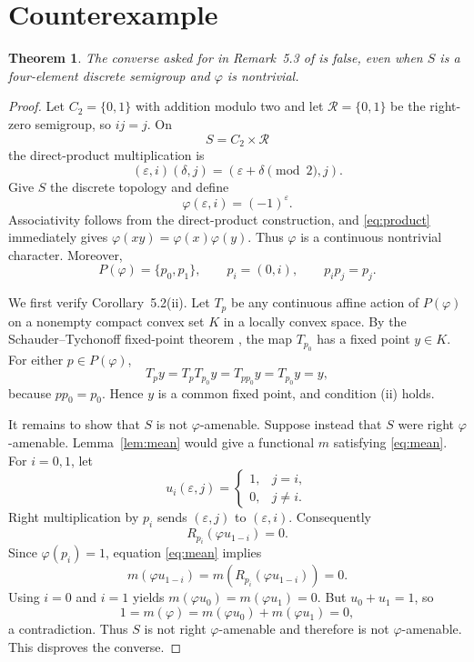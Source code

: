 \documentclass[11pt]{article}
\newtheorem{theorem}{Theorem}
\newcommand{\R}{\mathcal R}
\begin{document}
\section{Counterexample}

\begin{theorem}\label{thm:main}
The converse asked for in Remark~5.3 of \cite{JEG} is false, even when $S$ is
a four-element discrete semigroup and $\varphi$ is nontrivial.
\end{theorem}

\begin{proof}
Let $C_2=\{0,1\}$ with addition modulo two and let
$\R=\{0,1\}$ be the right-zero semigroup, so $ij=j$.  On
\[
 S=C_2\times\R
\]
the direct-product multiplication is
\begin{equation}\label{eq:product}
 (\varepsilon,i)(\delta,j)=(\varepsilon+\delta\!\!\pmod 2,j).
\end{equation}
Give $S$ the discrete topology and define
\[
 \varphi(\varepsilon,i)=(-1)^\varepsilon.
\]
Associativity follows from the direct-product construction, and
\eqref{eq:product} immediately gives
$\varphi(xy)=\varphi(x)\varphi(y)$.  Thus $\varphi$ is a continuous nontrivial
character.  Moreover,
\[
 P(\varphi)=\{p_0,p_1\},
 \qquad p_i=(0,i),
 \qquad p_ip_j=p_j.
\]

We first verify Corollary~5.2(ii).  Let $T_p$ be any continuous affine action
of $P(\varphi)$ on a nonempty compact convex set $K$ in a locally convex
space.  By the Schauder--Tychonoff fixed-point theorem \cite{Tychonoff}, the
map $T_{p_0}$ has a fixed point $y\in K$.  For either $p\in P(\varphi)$,
\[
 T_py=T_pT_{p_0}y=T_{pp_0}y=T_{p_0}y=y,
\]
because $pp_0=p_0$.  Hence $y$ is a common fixed point, and condition (ii)
holds.

It remains to show that $S$ is not $\varphi$-amenable.  Suppose instead that
$S$ were right $\varphi$-amenable.  Lemma~\ref{lem:mean} would give a
functional $m$ satisfying \eqref{eq:mean}.  For $i=0,1$, let
\[
 u_i(\varepsilon,j)=\begin{cases}1,&j=i,\\0,&j\ne i.\end{cases}
\]
Right multiplication by $p_i$ sends $(\varepsilon,j)$ to
$(\varepsilon,i)$.  Consequently
\[
 R_{p_i}(\varphi u_{1-i})=0.
\]
Since $\varphi(p_i)=1$, equation \eqref{eq:mean} implies
\[
 m(\varphi u_{1-i})=m(R_{p_i}(\varphi u_{1-i}))=0.
\]
Using $i=0$ and $i=1$ yields
$m(\varphi u_0)=m(\varphi u_1)=0$.  But $u_0+u_1=1$, so
\[
 1=m(\varphi)=m(\varphi u_0)+m(\varphi u_1)=0,
\]
a contradiction.  Thus $S$ is not right $\varphi$-amenable and therefore is
not $\varphi$-amenable.  This disproves the converse.
\end{proof}
\end{document}
